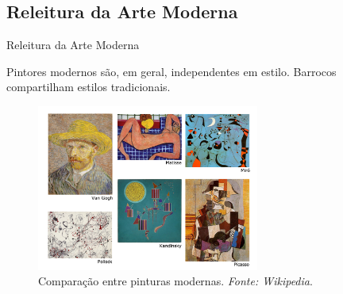 \documentclass{beamer}
\begin{document}



\subsection{Releitura da Arte Moderna}

\begin{frame}{Releitura da Arte Moderna}
  
  Pintores modernos são, em geral, independentes em estilo. Barrocos compartilham estilos
  tradicionais.

  \begin{figure}[h!]
  \begin{center}
    \includegraphics[width=0.65\textwidth]{figs/compara_moderno2.png}
    \caption{Comparação entre pinturas modernas. \textit{Fonte: Wikipedia}.}
\end{center}
\end{figure}

\end{frame}
\end{document}
